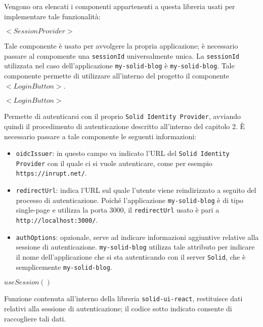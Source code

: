 \bigskip

Vengono ora elencati i componenti appartenenti a questa libreria usati per implementare tale funzionalità:

\bigskip
\medskip

$<SessionProvider>$

\bigskip

Tale componente è usato per avvolgere la propria applicazione; è necessario passare al compomente una {\tt sessionId} universalmente unica. La {\tt sessionId} utilizzata nel caso dell'applicazione {\tt my-solid-blog} è {\tt my-solid-blog}. Tale componente permette di utilizzare all'interno del progetto il componente $<LoginButton>$.

\bigskip
\medskip

$<LoginButton>$

\bigskip

Permette di autenticarsi con il proprio {\tt Solid Identity Provider}, avviando quindi il procedimento di autenticazione descritto all'interno del capitolo 2. È necessario passare a tale componente le seguenti informazioni:

\begin{itemize}
	\item {\tt oidcIssuer}: in questo campo va indicato l'URL del {\tt Solid Identity Provider} con il quale ci si vuole autenticare, come per esempio {\tt https://inrupt.net/}.
	\item {\tt redirectUrl}: indica l'URL sul quale l'utente viene reindirizzato a seguito del processo di autenticazione. Poiché l'applicazione {\tt my-solid-blog} è di tipo single-page e utilizza la porta 3000, il {\tt redirectUrl} usato è pari a {\tt http://localhost:3000/}.
	\item {\tt authOptions}: opzionale, serve ad indicare informazioni aggiuntive relative alla sessione di autenticazione. {\tt my-solid-blog} utilizza tale attributo per indicare il nome dell'applicazione che si sta autenticando con il server {\tt Solid}, che è semplicemente {\tt my-solid-blog}.
\end{itemize}

\bigskip
\medskip

$useSession()$

\bigskip

Funzione contenuta all'interno della libreria {\tt solid-ui-react}, restituisce dati relativi alla sessione di autenticazione; il codice sotto indicato consente di raccogliere tali dati.

\bigskip

